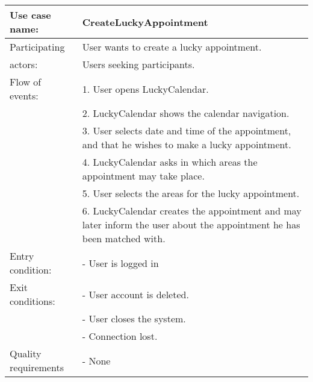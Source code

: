 {\tabulinesep=1.2mm
\begin{tabu}{ | p{3cm} | p{13cm} |}
    \hline
    Use case name: 			& 		CreateLuckyAppointment\\ \hline
    Participating  			& 		User wants to create a lucky appointment. \\
    actors:					&		Users seeking participants.\\ \hline
    Flow of events: 		& 		1. User opens LuckyCalendar. \\
							&		2. LuckyCalendar shows the calendar navigation.\\
							&		3. User selects date and time of the appointment, and that he wishes to make a lucky appointment.\\
							&		4. LuckyCalendar asks in which areas the appointment may take place.\\
							&		5. User selects the areas for the lucky appointment.\\
							&		6. LuckyCalendar creates the appointment and may later inform the user about the appointment he has been matched with.\\ \hline
    Entry condition: 		& 		- User is logged in  \\ \hline
	Exit conditions: 		&		- User account is deleted.\\
							&		- User closes the system.\\
							&		- Connection lost.\\\hline
	Quality requirements	&	 	- None \\\hline
\end{tabu}
}